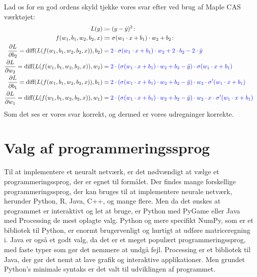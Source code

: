 \documentclass{article}
\begin{document}
Lad os for en god ordens skyld tjekke vores svar efter ved brug af Maple CAS værktøjet:
\begin{align}
  L(y)&\coloneqq(y-\hat{y})^{2}\colon\\
  f(w_{1},b_{1},w_{2},b_{2},x)&\coloneqq\sigma(w_{1}\cdot x+b_{1})\cdot w_{2}+b_{2}\colon\\
  \frac{\partial L}{\partial b_{2}}=\text{diff}(L(f(w_{1},b_{1},w_{2},b_{2},x)),b_2)&=\color{blue}2\cdot\sigma(w_{1}\cdot x+b_{1})\cdot w_{2}+2\cdot b_{2}-2\cdot\hat{y}\\
  \frac{\partial L}{\partial w_{2}}= \text{diff}(L(f(w_{1},b_{1},w_{2},b_{2},x)),w_2)&=\color{blue}2\cdot(\sigma(w_{1}\cdot x+b_{1})\cdot w_{2}+b_{2}-\hat{y})\cdot\sigma(w_{1}\cdot x+b_{1})\\
  \frac{\partial L}{\partial b_{1}}= \text{diff}(L(f(w_{1},b_{1},w_{2},b_{2},x)),b_1)&=\color{blue}2\cdot(\sigma(w_{1}\cdot x+b_{1})\cdot w_{2}+b_{2}-\hat{y})\cdot w_{2}\cdot\sigma'(w_{1}\cdot x+b_{1})\\
  \frac{\partial L}{\partial w_{1}}= \text{diff}(L(f(w_{1},b_{1},w_{2},b_{2},x)),w_1)&=\color{blue}2\cdot(\sigma(w_{1}\cdot x+b_{1})\cdot w_{2}+b_{2}-\hat{y})\cdot w_{2}\cdot x\cdot\sigma'(w_{1}\cdot x+b_{1})
\end{align}
Som det ses er vores svar korrekt, og dermed er vores udregninger korrekte. 
\section{Valg af programmeringssprog}
Til at implementere et neuralt netværk, er det nødvændigt at vælge et programmeringssprog, der er egnet til formålet. Der findes mange forskellige programmeringssprog, der kan bruges til at implementere neurale netværk, herunder Python, R, Java, C++, og mange flere. Men da det ønskes at programmet er interaktivt og let at bruge, er Python med PyGame eller Java med Processing de mest oplagte valg. Python og mere specifikt NumPy, som er et bibliotek til Python, er enormt brugervenligt og hurtigt at udføre matriceregning i. Java er også et godt valg, da det er et meget populært programmeringssprog, med faste typer som gør det nemmere at undgå fejl. Processing er et bibliotek til Java, der gør det nemt at lave grafik og interaktive applikationer. Men grundet Python's minimale syntaks er det valt til udviklingen af programmet.

\newpage
\printbibliography
\end{document}
